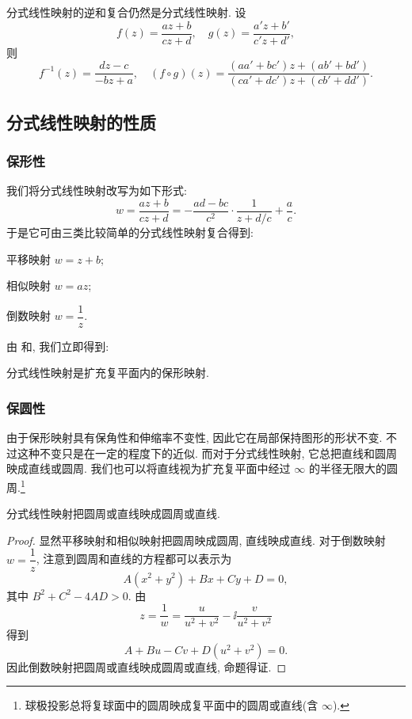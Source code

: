 分式线性映射的逆和复合仍然是分式线性映射.
设
\[
  f(z)=\frac{az+b}{cz+d},\quad
  g(z)=\frac{a'z+b'}{c'z+d'},
\]
则
\[
  f^{-1}(z)=\frac{dz-c}{-bz+a},\quad
  (f\circ g)(z)=\frac{(aa'+bc')z+(ab'+bd')}{(ca'+dc')z+(cb'+dd')}.
\]

\subsection{分式线性映射的性质}

\subsubsection{保形性}

我们将分式线性映射改写为如下形式:
\[
   w
  =\frac{az+b}{cz+d}
  =-\frac{ad-bc}{c^2}\cdot\frac1{z+d/c}+\frac ac.
\]
于是它可由三类比较简单的分式线性映射复合得到:
\begin{enuma}
  \item 平移映射 $w=z+b$;
  \item 相似映射 $w=az$;\smallskip
  \item 倒数映射 $w=\dfrac1z$.
\end{enuma}
\smallskip
由 和, 我们立即得到:

\begin{theorem}
  分式线性映射是扩充复平面内的保形映射.
\end{theorem}


\subsubsection{保圆性}

由于保形映射具有保角性和伸缩率不变性, 因此它在局部保持图形的形状不变.
不过这种不变只是在一定的程度下的近似.
而对于分式线性映射, 它总把直线和圆周映成直线或圆周.
我们也可以将直线视为扩充复平面中经过 $\infty$ 的半径无限大的圆周.\footnote{
  球极投影总将复球面中的圆周映成复平面中的圆周或直线(含 $\infty$).
}

\begin{theorem}
  分式线性映射把圆周或直线映成圆周或直线.
\end{theorem}

\begin{proof}
  显然平移映射和相似映射把圆周映成圆周, 直线映成直线.
  对于倒数映射 $w=\dfrac1z$, 注意到圆周和直线的方程都可以表示为
  \[
    A(x^2+y^2)+Bx+Cy+D=0,
  \]
  其中 $B^2+C^2-4AD>0$. 由
  \[
      z
    =\frac1w
    =\frac{u}{u^2+v^2}-\ii \frac{v}{u^2+v^2}
  \]
  得到
  \[
    A+Bu-Cv+D(u^2+v^2)=0.
  \]
  因此倒数映射把圆周或直线映成圆周或直线, 命题得证.
\end{proof}

